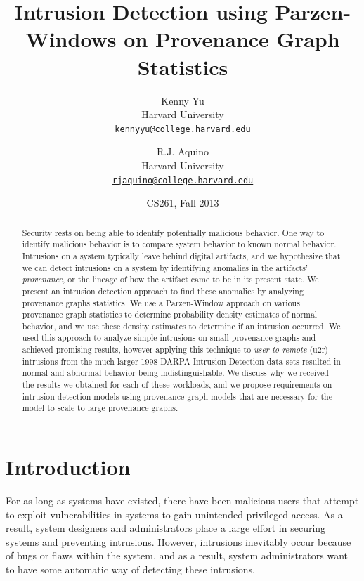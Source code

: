 \documentclass[10pt,twocolumn]{article}
\title{{\bf Intrusion Detection using Parzen-Windows on Provenance Graph Statistics}}
\author{
    Kenny Yu\\
    Harvard University\\
    \href{mailto:kennyyu@college.harvard.edu}{\texttt{kennyyu@college.harvard.edu}}
  \and
    R.J. Aquino\\
    Harvard University\\
    \href{mailto:rjaquino@college.harvard.edu}{\texttt{rjaquino@college.harvard.edu}}
}
\date{CS261, Fall 2013}
\begin{document}
\maketitle

%

\begin{abstract}
Security rests on being able to identify potentially malicious behavior.
One way to identify malicious behavior is to compare system behavior to known normal behavior.
Intrusions on a system typically leave behind digital artifacts, and we hypothesize
that we can detect intrusions on a system by identifying anomalies in the artifacts' {\em provenance}, or the lineage of how
the artifact came to be in its present state.
We present an intrusion detection approach to find these anomalies by analyzing provenance graphs statistics. We use a Parzen-Window approach \cite{parzen} on various provenance graph statistics \cite{clustering} 
to determine probability density estimates of normal behavior, and we use these density estimates to 
determine if an intrusion occurred. We used this approach to analyze simple intrusions on small provenance graphs and achieved promising results, however applying this technique to {\em user-to-remote} (u2r) intrusions 
from the much larger 1998 DARPA Intrusion Detection data sets  \cite{darpa} resulted in normal and abnormal behavior being indistinguishable. We discuss why we received the results we obtained for each of these workloads, and we propose requirements on intrusion detection models using provenance graph models that are necessary for the model to scale to large provenance graphs.

\end{abstract}

%

\section{Introduction}

For as long as systems have existed, there have been malicious users that attempt to exploit vulnerabilities
in systems to gain unintended privileged access. As a result, system designers and 
administrators place a large effort in securing systems and preventing intrusions. However, intrusions
inevitably occur because of bugs or flaws within the system, and as a result, system administrators want to
have some automatic way of detecting these intrusions. 
\end{document}
